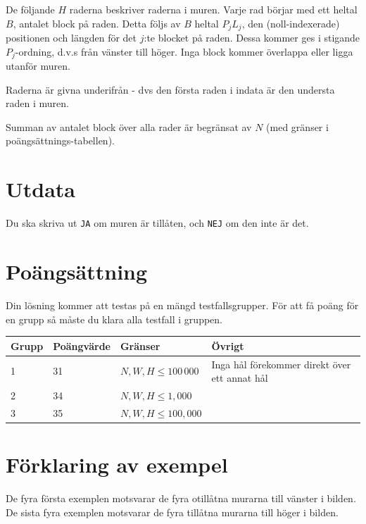 De följande $H$ raderna beskriver raderna i muren.
Varje rad börjar med ett heltal $B$, antalet block på raden.
Detta följs av $B$ heltal $P_j L_j$, den (noll-indexerade) positionen och längden för det $j$:te blocket på raden. Dessa kommer ges i stigande $P_j$-ordning, d.v.s från vänster till höger.
Inga block kommer överlappa eller ligga utanför muren.

Raderna är givna underifrån - dvs den första raden i indata är den understa raden i muren.

Summan av antalet block över alla rader är begränsat av $N$ (med gränser i poängsättnings-tabellen).

\section*{Utdata}
Du ska skriva ut \texttt{JA} om muren är tillåten, och \texttt{NEJ} om den inte är det.

\section*{Poängsättning}
Din lösning kommer att testas på en mängd testfallsgrupper. För att få poäng för en grupp
så måste du klara alla testfall i gruppen.

\begin{tabular}{| l | l | l | l |}
\hline
Grupp & Poängvärde & Gränser & Övrigt \\ \hline
1     & 31         & $N, W, H \le 100\,000$ & Inga hål förekommer direkt över ett annat hål \\ \hline
2     & 34         & $N, W, H \le 1,000$ & \\ \hline
3     & 35         & $N, W, H \le 100,000$ & \\ \hline
\end{tabular}

\section*{Förklaring av exempel}
De fyra första exemplen motsvarar de fyra otillåtna murarna till vänster i bilden.
De sista fyra exemplen motsvarar de fyra tillåtna murarna till höger i bilden.
